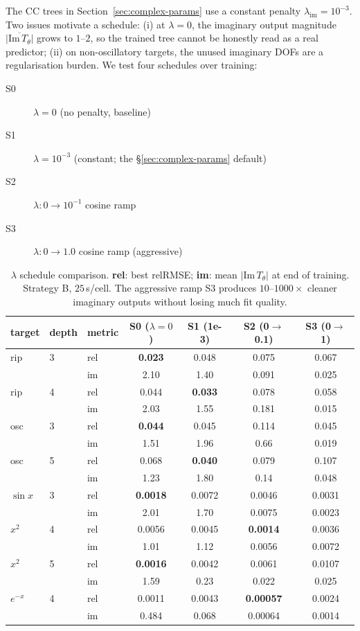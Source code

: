 \documentclass[11pt]{article}
\begin{document}
The CC trees in Section~\ref{sec:complex-params} use a constant penalty
$\lambda_{\mathrm{im}} = 10^{-3}$. Two issues motivate a schedule:
(i) at $\lambda{=}0$, the imaginary output magnitude $\overline{|\mathrm{Im}\,
T_\theta|}$ grows to $1$--$2$, so the trained tree cannot be honestly read
as a real predictor; (ii) on non-oscillatory targets, the unused imaginary
DOFs are a regularisation burden. We test four schedules over training:

\begin{description}
\item[S0] $\lambda = 0$ (no penalty, baseline)
\item[S1] $\lambda = 10^{-3}$ (constant; the §\ref{sec:complex-params} default)
\item[S2] $\lambda: 0 \to 10^{-1}$ cosine ramp
\item[S3] $\lambda: 0 \to 1.0$ cosine ramp (aggressive)
\end{description}

\begin{table}[h]
\centering\small
\caption{$\lambda$ schedule comparison. \textbf{rel}: best relRMSE; \textbf{im}:
mean $|\mathrm{Im}\,T_\theta|$ at end of training. Strategy B, $25\,$s/cell.
The aggressive ramp S3 produces $10$--$1000\times$ cleaner imaginary outputs
without losing much fit quality.}
\label{tab:anneal}
\begin{tabular}{lllcccc}
\toprule
target & depth & metric & S0 ($\lambda{=}0$) & S1 (1e-3) & S2 (0$\to$0.1) & S3 (0$\to$1) \\
\midrule
rip & 3 & rel & \textbf{0.023} & 0.048 & 0.075 & 0.067 \\
    &   & im  & 2.10 & 1.40 & 0.091 & 0.025 \\
rip & 4 & rel & 0.044 & \textbf{0.033} & 0.078 & 0.058 \\
    &   & im  & 2.03 & 1.55 & 0.181 & 0.015 \\
\midrule
osc & 3 & rel & \textbf{0.044} & 0.045 & 0.114 & 0.045 \\
    &   & im  & 1.51 & 1.96 & 0.66 & 0.019 \\
osc & 5 & rel & 0.068 & \textbf{0.040} & 0.079 & 0.107 \\
    &   & im  & 1.23 & 1.80 & 0.14 & 0.048 \\
\midrule
$\sin x$    & 3 & rel & \textbf{0.0018} & 0.0072 & 0.0046 & 0.0031 \\
            &   & im  & 2.01 & 1.70 & 0.0075 & 0.0023 \\
\midrule
$x^2$       & 4 & rel & 0.0056 & 0.0045 & \textbf{0.0014} & 0.0036 \\
            &   & im  & 1.01 & 1.12 & 0.0056 & 0.0072 \\
$x^2$       & 5 & rel & \textbf{0.0016} & 0.0042 & 0.0061 & 0.0107 \\
            &   & im  & 1.59 & 0.23 & 0.022 & 0.025 \\
\midrule
$e^{-x}$    & 4 & rel & 0.0011 & 0.0043 & \textbf{0.00057} & 0.0024 \\
            &   & im  & 0.484 & 0.068 & 0.00064 & 0.0014 \\
\bottomrule
\end{tabular}
\end{table}
\end{document}
